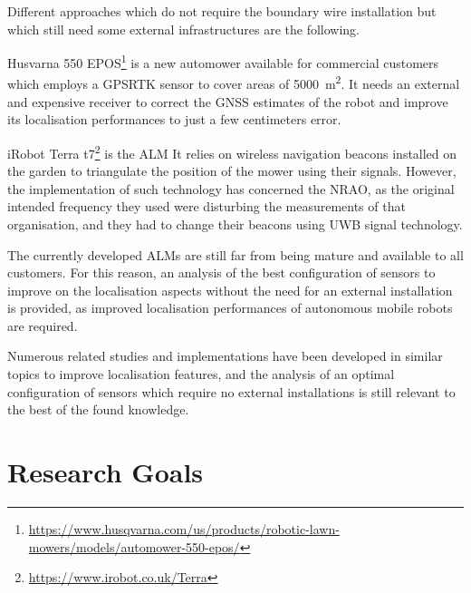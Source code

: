 Different approaches which do not require the boundary wire installation but which still need some external infrastructures are the following.

Husvarna 550 EPOS\footnote{\url{https://www.husqvarna.com/us/products/robotic-lawn-mowers/models/automower-550-epos/}} is a new automower available for commercial customers which employs a \gls{GPSRTK} sensor to cover areas of \SI{5000}{\meter\squared}. It needs an external and expensive receiver to correct the \gls{GNSS} estimates of the robot and improve its localisation performances to just a few centimeters error.

iRobot Terra t7\footnote{\url{https://www.irobot.co.uk/Terra}} is the \gls{ALM} 
It relies on wireless navigation beacons installed on the garden to triangulate the position of the mower using their signals. However, the implementation of such technology has concerned the \gls{NRAO}, as the original intended frequency they used were disturbing the measurements of that organisation, and they had to change their beacons using \gls{UWB} signal technology. 

The currently developed \gls{ALM}s are still far from being mature and available to all customers.
For this reason, an analysis of the best configuration of sensors to improve on the localisation aspects without the need for an external installation is provided, as improved localisation performances of autonomous mobile robots are required.

Numerous related studies and implementations have been developed in similar topics to improve localisation features, and the analysis of an optimal configuration of sensors which require no external installations is still relevant to the best of the found knowledge.


\section{Research Goals}


